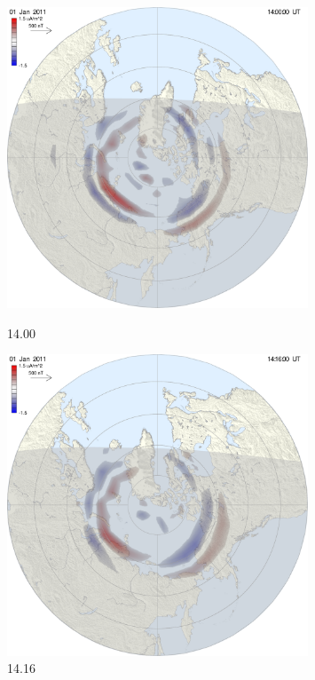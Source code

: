 \begin{figure}[ht!]
\begin{minipage}{0.33\textwidth}
\includegraphics[width=0.8\textwidth]{Figures/Ampere/1293890400at1400north.pdf}
\caption{14.00}
\end{minipage}
\begin{minipage}{0.33\textwidth}
\includegraphics[width= 0.8\textwidth]{Figures/Ampere/1293891360at1416north.pdf}
\caption{14.16}
\end{minipage}
\begin{minipage}{0.33\textwidth}

\end{minipage}
\end{figure}
